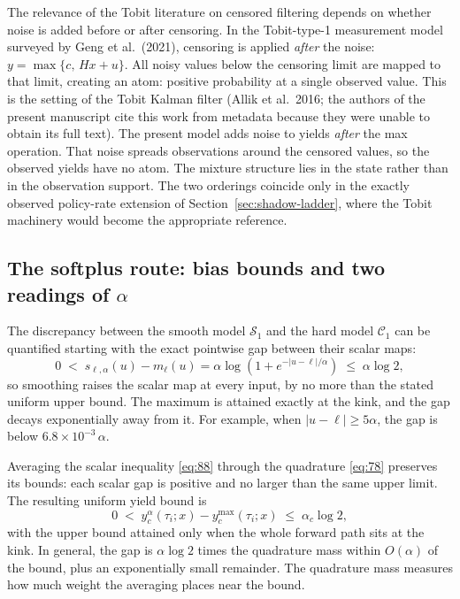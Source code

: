 \documentclass[11pt]{article}
\begin{document}
The relevance of the Tobit literature on censored filtering depends on
whether noise is added before or after censoring. In the
Tobit-type-1 measurement model surveyed by
Geng et al.\ (2021), censoring is applied
\emph{after} the noise: \(y=\max\{c,\,Hx+u\}\).
All noisy values below the censoring limit are mapped to that limit,
creating an atom: positive probability at a single observed value.
This is the setting of the Tobit Kalman filter (Allik et al.\
2016; the authors of the present manuscript cite this work from metadata
because they were unable to obtain its full text).
The present model adds noise to yields \emph{after} the max operation.
That noise spreads observations around the censored values, so the
observed yields have no atom. The mixture structure lies in the state
rather than in the observation support. The two orderings coincide
only in the exactly observed policy-rate extension of
Section~\ref{sec:shadow-ladder}, where the Tobit machinery
would become the appropriate reference.

\subsection{The softplus route: bias bounds and two readings of
\texorpdfstring{$\alpha$}{alpha}}
\label{sec:shadow-softplus}

The discrepancy between the smooth model
\(\mathcal S_1\) and the hard model
\(\mathcal C_1\) can be quantified starting with
the exact pointwise gap between their scalar maps:
\begin{equation}\label{eq:88}
 0\;<\;s_{\ell,\alpha}(u)-m_\ell(u)
 =\alpha\log\!\left(1+e^{-|u-\ell|/\alpha}\right)
 \;\leq\;\alpha\log 2,
\end{equation}
so smoothing raises the scalar map at every input, by no more than the
stated uniform upper bound. The maximum is attained exactly at the
kink, and the gap decays exponentially away from it. For example, when
\(|u-\ell|\geq5\alpha\), the gap is below
\(6.8\times10^{-3}\,\alpha\).

Averaging the scalar inequality \eqref{eq:88}
through the quadrature \eqref{eq:78} preserves
its bounds: each scalar gap is positive and no larger than the same
upper limit. The resulting uniform yield bound is
\begin{equation}\label{eq:89}
 0\;<\;y_c^{\alpha}(\tau_i;x)-y_c^{\max}(\tau_i;x)\;\leq\;\alpha_c\log 2,
\end{equation}
with the upper bound attained only when the whole forward path sits
at the kink. In general, the gap is
\(\alpha\log2\) times the quadrature mass within
\(O(\alpha)\) of the bound, plus an exponentially
small remainder. The quadrature mass measures how much weight the
averaging places near the bound.
\end{document}

